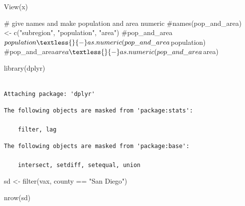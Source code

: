 \documentclass[
  letterpaper,
  DIV=11,
  numbers=noendperiod]{scrartcl}
\newenvironment{Shaded}{\begin{snugshade}}{\end{snugshade}}
\newcommand{\CommentTok}[1]{\textcolor[rgb]{0.37,0.37,0.37}{#1}}
\newcommand{\FunctionTok}[1]{\textcolor[rgb]{0.28,0.35,0.67}{#1}}
\newcommand{\NormalTok}[1]{\textcolor[rgb]{0.00,0.23,0.31}{#1}}
\newcommand{\OtherTok}[1]{\textcolor[rgb]{0.00,0.23,0.31}{#1}}
\newcommand{\SpecialCharTok}[1]{\textcolor[rgb]{0.37,0.37,0.37}{#1}}
\newcommand{\StringTok}[1]{\textcolor[rgb]{0.13,0.47,0.30}{#1}}
\begin{document}
\begin{Shaded}
\begin{Highlighting}[]
\FunctionTok{View}\NormalTok{(x)}
\end{Highlighting}
\end{Shaded}

\begin{Shaded}
\begin{Highlighting}[]
    \CommentTok{\# give names and make population and area numeric}
    \CommentTok{\#names(pop\_and\_area) \textless{}{-} c("subregion", "population", "area")}
    \CommentTok{\#pop\_and\_area$population \textless{}{-} as.numeric(pop\_and\_area$population)}
    \CommentTok{\#pop\_and\_area$area \textless{}{-} as.numeric(pop\_and\_area$area)}
\end{Highlighting}
\end{Shaded}

\begin{Shaded}
\begin{Highlighting}[]
\FunctionTok{library}\NormalTok{(dplyr)}
\end{Highlighting}
\end{Shaded}

\begin{verbatim}

Attaching package: 'dplyr'
\end{verbatim}

\begin{verbatim}
The following objects are masked from 'package:stats':

    filter, lag
\end{verbatim}

\begin{verbatim}
The following objects are masked from 'package:base':

    intersect, setdiff, setequal, union
\end{verbatim}

\begin{Shaded}
\begin{Highlighting}[]
\NormalTok{sd }\OtherTok{\textless{}{-}} \FunctionTok{filter}\NormalTok{(vax, county }\SpecialCharTok{==} \StringTok{"San Diego"}\NormalTok{)}
\end{Highlighting}
\end{Shaded}

\begin{Shaded}
\begin{Highlighting}[]
\FunctionTok{nrow}\NormalTok{(sd)}
\end{Highlighting}
\end{Shaded}
\end{document}
